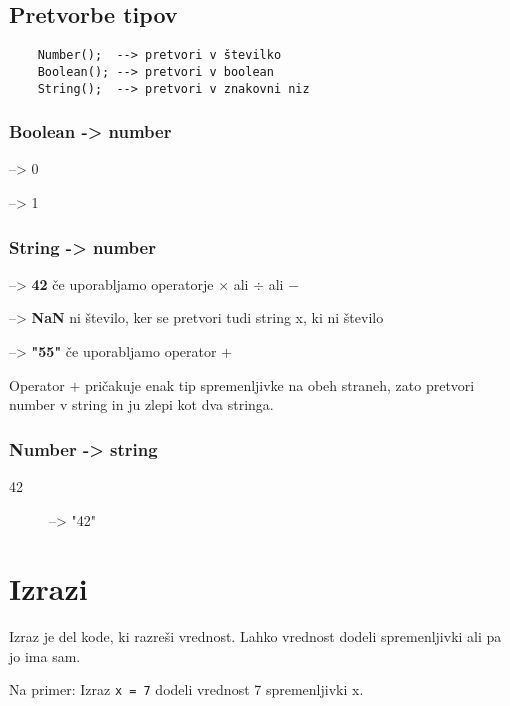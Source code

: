 \subsection{Pretvorbe tipov}

\begin{verbatim}
	Number();  --> pretvori v številko
	Boolean(); --> pretvori v boolean
	String();  --> pretvori v znakovni niz
\end{verbatim}
\subsubsection*{Boolean -> number}
\begin{description}[align=left]
	\item[\texttt{FALSE}] --> 0
	\item[\texttt{TRUE}]  --> 1
\end{description}
\subsubsection*{String -> number}
\begin{description}[align=left]
	\item["42"] --> \textbf{42} če uporabljamo operatorje $\times$ ali $\div$ ali $-$	
	\item["5x"] --> \textbf{NaN} ni število, ker se pretvori tudi string x, ki ni število
	\item["5"+5] --> \textbf{"55"} če uporabljamo operator $+$
\end{description}
Operator $+$ pričakuje enak tip spremenljivke na obeh straneh, zato pretvori number v string in ju zlepi kot dva stringa.
\subsubsection*{Number -> string}
\begin{description}
	\item[42] --> "42"
\end{description}

\pagebreak

\section{Izrazi}
Izraz je del kode, ki razreši vrednost. Lahko vrednost dodeli spremenljivki ali pa jo ima sam.\

Na primer: Izraz \texttt{x = 7} dodeli vrednost 7 spremenljivki x.\

